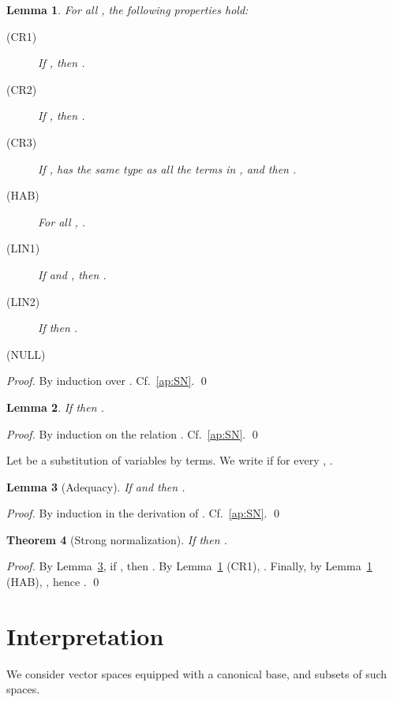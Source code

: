 \documentclass[preprint]{elsarticle}
\newtheorem{theorem}{Theorem}[section]
\newtheorem{lemma}[theorem]{Lemma}
\begin{document}
\begin{lemma}\label{lem:cr}
  For all , the following properties hold:
  \begin{description}
    \item[(CR1)] If , then .
    \item[(CR2)] If , then .
    \item[(CR3)] If ,  has the same type as all the
      terms in , and  then .
    \item[(HAB)] For all , .
    \item[(LIN1)] If  and , then .
    \item[(LIN2)] If  then .
    \item[(NULL)] 
  \end{description}
\end{lemma}
\begin{proof}
  By induction over . Cf.~\ref{ap:SN}. \qed
\end{proof}

\begin{lemma}\label{lem:a_subset_b}
  If  then .
\end{lemma}
\begin{proof}
  By induction on the relation . Cf.~\ref{ap:SN}. \qed
\end{proof}

Let  be a substitution of variables by terms. We write
 if for every , .

\begin{lemma}[Adequacy]\label{lem:adequacy}
  If  and  then .
\end{lemma}
\begin{proof}
  By induction in the derivation of . Cf.~\ref{ap:SN}. \qed
\end{proof}

\begin{theorem}
  [Strong normalization]\label{thm:SN}
  If  then .
\end{theorem}
\begin{proof}
  By Lemma~\ref{lem:adequacy}, if , then
  . By Lemma~\ref{lem:cr} (CR1), .
  Finally, by Lemma~\ref{lem:cr} (HAB), , hence .
  \qed
\end{proof}

\section{Interpretation}\label{sec:denSem}

We consider vector spaces equipped with a canonical base, and subsets of such
spaces.
\end{document}
